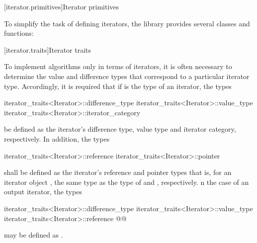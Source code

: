 [iterator.primitives]{Iterator primitives}

\pnum
To simplify the task of defining iterators, the library provides
several classes and functions:

[iterator.traits]{Iterator traits}


\pnum
{}%
To implement algorithms only in terms of iterators, it is often necessary to
determine the value and
difference types that correspond to a particular iterator type.
Accordingly, it is required that if
is the type of an iterator,
the types

%
%
%
\begin{codeblock}
iterator_traits<Iterator>::difference_type
iterator_traits<Iterator>::value_type
iterator_traits<Iterator>::iterator_category
\end{codeblock}

be defined as the iterator's difference type, value type and iterator category, respectively.
In addition, the types

%
%
\begin{codeblock}
iterator_traits<Iterator>::reference
iterator_traits<Iterator>::pointer
\end{codeblock}

shall be defined as the iterator's reference and pointer types\changed{,}{;} that is, for an
iterator object , the same type as the type of  and ,
respectively. n the case of an output
iterator, the types

\begin{codeblock}
iterator_traits<Iterator>::difference_type
iterator_traits<Iterator>::value_type
iterator_traits<Iterator>::reference
@@
\end{codeblock}

may be defined as .

